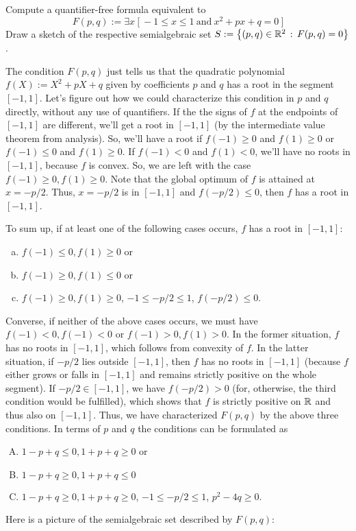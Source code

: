 \begin{exercise}
	Compute a quantifier-free formula equivalent to 
	\[
		F(p,q) := \exists x \ \bigl[ \ -1 \le x \le 1 \  \text{and} \ x^2 + p x + q = 0  \ \bigr]
	\]
	Draw a sketch of the respective semialgebraic set $S:= \left\{ (p,q) \in \mathbb{R}^2 \,:\, F(p,q) =0 \right\}$. 
\end{exercise}
\begin{solution}
	The condition $F(p,q)$ just tells us that the quadratic polynomial $f(X):=X^2 + p X + q$ given by coefficients $p$ and $q$ has a root in the segment $[-1,1]$. Let's figure out how we could characterize this condition in $p$ and $q$ directly, without any use of quantifiers. If the the signs of $f$ at the endpoints of $[-1,1]$ are different, we'll get a root in $[-1,1]$ (by the intermediate value theorem from analysis). So, we'll have a root if $f(-1) \ge 0$ and $f(1) \ge 0$ or $f(-1) \le 0$ and $f(1) \ge 0$. If $f(-1) < 0$ and $f(1) < 0$, we'll have no roots in $[-1,1]$, because $f$ is convex. So, we are left with the case $f(-1) \ge 0, f(1) \ge 0$. Note that the global optimum of $f$ is attained at $x = -p/2$. Thus, $x = -p/2$ is in $[-1,1]$ and $f(-p/2) \le 0$, then $f$ has a root in $[-1,1]$. 
	
	To sum up, if at least one of the following cases occurs, $f$ has a root in $[-1,1]$:
	\begin{enumerate}[(a)]
		\item $f(-1) \le 0, f(1) \ge 0$ or 
		\item $f(-1) \ge 0, f(1) \le 0$ or 
		\item $f(-1) \ge 0, f(1) \ge 0$, $-1 \le -p/2 \le 1$, $f(-p/2) \le 0$.
	\end{enumerate}
	Converse, if neither of the above cases occurs, we must have $f(-1)<0, f(-1) < 0$ or $f(-1) > 0, f(1) > 0$. In the former situation, $f$ has no roots in $[-1,1]$, which follows from convexity of $f$. In the latter situation, if $-p/2$ lies outside $[-1,1]$, then $f$ has no roots in $[-1,1]$ (because $f$ either grows or falls in $[-1,1]$ and remains strictly positive on the whole segment). If $-p/2 \in [-1,1]$, we have $f(-p/2) > 0$ (for, otherwise, the third condition would be fulfilled), which shows that $f$ is strictly positive on $\mathbb{R}$ and thus also on $[-1,1]$. Thus, we have characterized $F(p,q)$ by the above three conditions. In terms of $p$ and $q$ the conditions can be formulated as 
	\begin{enumerate}[(A)]
		\item $1 - p + q \le 0, 1 + p + q \ge 0$ or 
		\item $1 - p + q \ge 0, 1 + p + q \le 0$
		\item $1 - p+ q \ge 0, 1 + p + q \ge 0$, $-1 \le -p/2 \le 1$, $p^2 - 4 q \ge 0$. 
	\end{enumerate}
	Here is a picture of the semialgebraic set described by $F(p,q)$: 
	\begin{center}
\end{center}
\end{solution}
